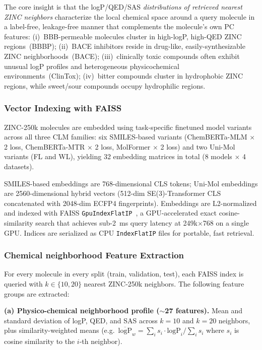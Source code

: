 \documentclass[9pt,twocolumn,conference]{IEEEtran}
\begin{document}
The core insight is that the logP/QED/SAS \emph{distributions of retrieved nearest ZINC neighbors} characterize the local chemical space around a query molecule in a label-free, leakage-free manner that complements the molecule's own PC features:
(i)~BBB-permeable molecules cluster in high-logP, high-QED ZINC regions~(BBBP);
(ii)~BACE inhibitors reside in drug-like, easily-synthesizable ZINC neighborhoods~(BACE);
(iii)~clinically toxic compounds often exhibit unusual logP profiles and heterogeneous physicochemical environments~(ClinTox);
(iv)~bitter compounds cluster in hydrophobic ZINC regions, while sweet/sour compounds occupy hydrophilic regions.

\subsubsection{Vector Indexing with FAISS}
ZINC-250k molecules are embedded using task-specific finetuned model variants across all three CLM families: six SMILES-based variants (ChemBERTa-MLM $\times$ 2 loss, ChemBERTa-MTR $\times$ 2 loss, MolFormer $\times$ 2 loss) and two Uni-Mol variants (FL and WL), yielding 32 embedding matrices in total (8 models $\times$ 4 datasets).

SMILES-based embeddings are 768-dimensional CLS tokens; Uni-Mol embeddings are 2560-dimensional hybrid vectors (512-dim SE(3)-Transformer CLS concatenated with 2048-dim ECFP4 fingerprints). Embeddings are L2-normalized and indexed with FAISS \texttt{GpuIndexFlatIP}~\cite{johnson2021faiss}, a GPU-accelerated exact cosine-similarity
search that achieves sub-2~ms query latency at 249k$\times$768 on a single GPU.
Indices are serialized as CPU \texttt{IndexFlatIP} files for portable, fast retrieval.

\subsubsection{Chemical neighborhood Feature Extraction}

For every molecule in every split (train, validation, test), each FAISS index is queried with $k \in \{10, 20\}$ nearest ZINC-250k neighbors. The following feature groups are extracted:

\textbf{(a) Physico-chemical neighborhood profile ($\sim$27 features).}
Mean and standard deviation of logP, QED, and SAS across $k = 10$ and $k = 20$ neighbors, plus similarity-weighted means (e.g.\ $\overline{\text{logP}}_w = \sum_i s_i \cdot
\text{logP}_i / \sum_i s_i$ where $s_i$ is cosine similarity to the $i$-th neighbor).
\end{document}
